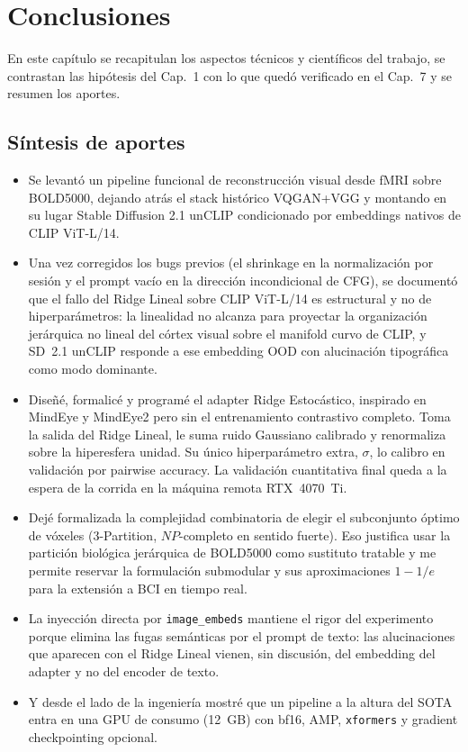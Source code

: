 \chapter{Conclusiones}

En este capítulo se recapitulan los aspectos técnicos y científicos del trabajo, se contrastan 
las hipótesis del Cap.~1 con lo que quedó verificado en el Cap.~7 y se resumen los aportes.

\section{Síntesis de aportes}

\begin{itemize}
\item[•] Se levantó un pipeline funcional de reconstrucción visual desde fMRI sobre BOLD5000, 
dejando atrás el stack histórico VQGAN+VGG y montando en su lugar Stable Diffusion 2.1 unCLIP 
condicionado por embeddings nativos de CLIP ViT-L/14.
\item[•] Una vez corregidos los bugs previos (el shrinkage en la normalización por sesión y el 
prompt vacío en la dirección incondicional de CFG), se documentó que el fallo del Ridge Lineal sobre 
CLIP ViT-L/14 es estructural y no de hiperparámetros: la linealidad no alcanza para proyectar la 
organización jerárquica no lineal del córtex visual sobre el manifold curvo de CLIP, y SD~2.1 
unCLIP responde a ese embedding OOD con alucinación tipográfica como modo dominante.
\item[•] Diseñé, formalicé y programé el adapter Ridge Estocástico, inspirado en MindEye y 
MindEye2 pero sin el entrenamiento contrastivo completo. Toma la salida del Ridge Lineal, le 
suma ruido Gaussiano calibrado y renormaliza sobre la hiperesfera unidad. Su único hiperparámetro 
extra, $\sigma$, lo calibro en validación por pairwise accuracy. La validación cuantitativa final 
queda a la espera de la corrida en la máquina remota RTX~4070~Ti.
\item[•] Dejé formalizada la complejidad combinatoria de elegir el subconjunto óptimo de vóxeles 
(3-Partition, $NP$-completo en sentido fuerte). Eso justifica usar la partición biológica 
jerárquica de BOLD5000 como sustituto tratable y me permite reservar la formulación submodular y 
sus aproximaciones $1-1/e$ para la extensión a BCI en tiempo real.
\item[•] La inyección directa por \texttt{image\_embeds} mantiene el rigor del experimento porque 
elimina las fugas semánticas por el prompt de texto: las alucinaciones que aparecen con el Ridge 
Lineal vienen, sin discusión, del embedding del adapter y no del encoder de texto.
\item[•] Y desde el lado de la ingeniería mostré que un pipeline a la altura del SOTA entra en una 
GPU de consumo (12~GB) con bf16, AMP, \texttt{xformers} y gradient checkpointing opcional.
\end{itemize}

